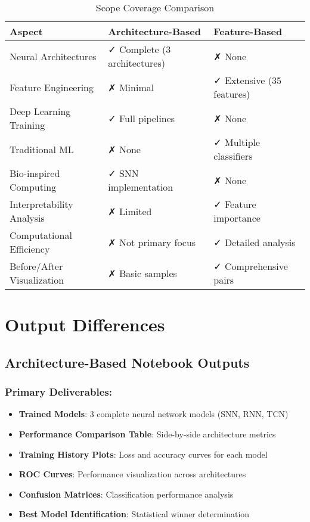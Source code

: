 \documentclass[11pt,a4paper]{article}
\begin{document}
\begin{table}[h]
\centering
\caption{Scope Coverage Comparison}
\begin{tabular}{@{}lll@{}}
\toprule
\textbf{Aspect} & \textbf{Architecture-Based} & \textbf{Feature-Based} \\
\midrule
Neural Architectures & ✓ Complete (3 architectures) & ✗ None \\
Feature Engineering & ✗ Minimal & ✓ Extensive (35 features) \\
Deep Learning Training & ✓ Full pipelines & ✗ None \\
Traditional ML & ✗ None & ✓ Multiple classifiers \\
Bio-inspired Computing & ✓ SNN implementation & ✗ None \\
Interpretability Analysis & ✗ Limited & ✓ Feature importance \\
Computational Efficiency & ✗ Not primary focus & ✓ Detailed analysis \\
Before/After Visualization & ✗ Basic samples & ✓ Comprehensive pairs \\
\bottomrule
\end{tabular}
\end{table}

\section{Output Differences}

\subsection{Architecture-Based Notebook Outputs}

\subsubsection{Primary Deliverables:}
\begin{itemize}
    \item \textbf{Trained Models}: 3 complete neural network models (SNN, RNN, TCN)
    \item \textbf{Performance Comparison Table}: Side-by-side architecture metrics
    \item \textbf{Training History Plots}: Loss and accuracy curves for each model
    \item \textbf{ROC Curves}: Performance visualization across architectures
    \item \textbf{Confusion Matrices}: Classification performance analysis
    \item \textbf{Best Model Identification}: Statistical winner determination
\end{itemize}
\end{document}
